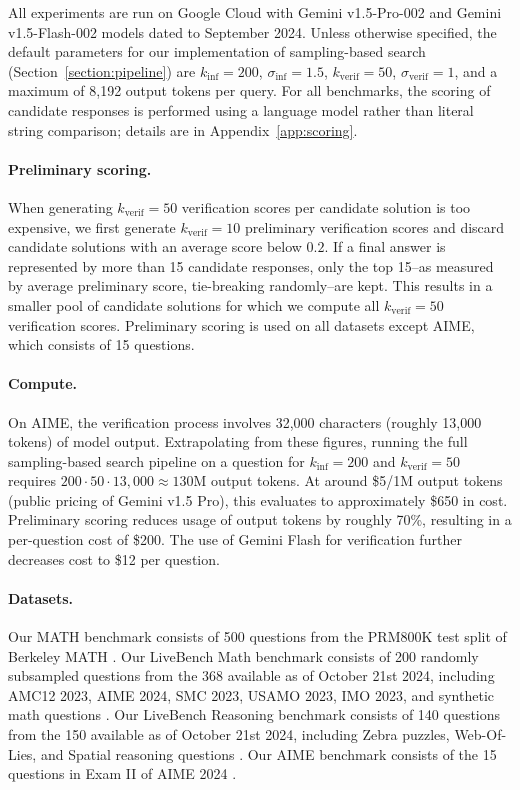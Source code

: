 All experiments are run on Google Cloud with Gemini v1.5-Pro-002 and Gemini v1.5-Flash-002 models dated to September 2024.
Unless otherwise specified, the default parameters for our implementation of sampling-based search (Section~\ref{section:pipeline}) are $k_{\mathrm{inf}} = 200$, $\sigma_{\mathrm{inf}} = 1.5$, $k_{\mathrm{verif}} = 50$, $\sigma_{\mathrm{verif}} = 1$, and a maximum of 8,192 output tokens per query.
For all benchmarks, the scoring of candidate responses is performed using a language model rather than literal string comparison; details are in Appendix~\ref{app:scoring}.

\paragraph{Preliminary scoring.}
When generating $k_{\mathrm{verif}} = 50$ verification scores per candidate solution is too expensive, we first generate $k_{\mathrm{verif}} = 10$ preliminary verification scores and discard candidate solutions with an average score below $0.2$.
If a final answer is represented by more than 15 candidate responses, only the top 15--as measured by average preliminary score, tie-breaking randomly--are kept.
This results in a smaller pool of candidate solutions for which we compute all $k_{\mathrm{verif}} = 50$ verification scores.
Preliminary scoring is used on all datasets except AIME, which consists of 15 questions. 

\paragraph{Compute.}
On AIME, the verification process involves 32,000 
characters (roughly 13,000 tokens) of model output. %
Extrapolating from these figures, running the full sampling-based search pipeline on a question for $k_{\mathrm{inf}} = 200$ and $k_{\mathrm{verif}} = 50$ requires $200 \cdot 50 \cdot 13,000 \approx 130$M output tokens.
At around \$5/1M output tokens (public pricing of Gemini v1.5 Pro), this evaluates to approximately \$650 in cost.
Preliminary scoring reduces usage of output tokens by roughly 70\%, resulting in a per-question cost of \$200.
The use of Gemini Flash for verification further decreases cost to \$12 per question.

\paragraph{Datasets.}
Our MATH benchmark consists of 500 questions from the PRM800K \citep{DBLP:conf/iclr/LightmanKBEBLLS24} test split of Berkeley MATH \citep{DBLP:conf/nips/HendrycksBKABTS21}.
Our LiveBench Math benchmark consists of 200 randomly subsampled questions from the 368 available as of October 21st 2024, including AMC12 2023, AIME 2024, SMC 2023, USAMO 2023, IMO 2023, and synthetic math questions \citep{white2024livebenchchallengingcontaminationfreellm}.
Our LiveBench Reasoning benchmark consists of 140 questions from the 150 available as of October 21st 2024, including Zebra puzzles, Web-Of-Lies, and Spatial reasoning questions \citep{white2024livebenchchallengingcontaminationfreellm}.
Our AIME benchmark consists of the 15 questions in Exam II of AIME 2024 \citep{aime2024}. 
